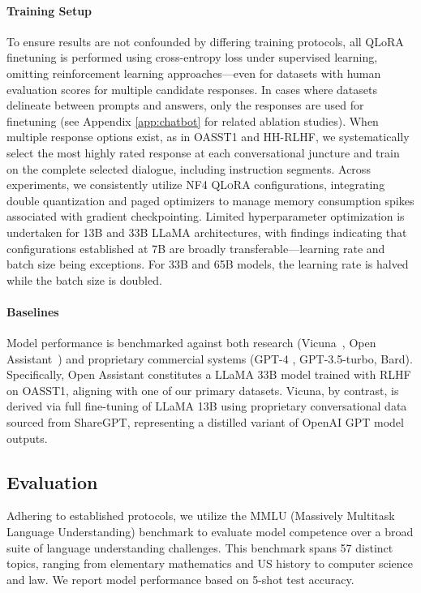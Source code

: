 \paragraph{Training Setup} To ensure results are not confounded by differing training protocols, all QLoRA finetuning is performed using cross-entropy loss under supervised learning, omitting reinforcement learning approaches—even for datasets with human evaluation scores for multiple candidate responses. In cases where datasets delineate between prompts and answers, only the responses are used for finetuning (see Appendix \ref{app:chatbot} for related ablation studies). When multiple response options exist, as in OASST1 and HH-RLHF, we systematically select the most highly rated response at each conversational juncture and train on the complete selected dialogue, including instruction segments. Across experiments, we consistently utilize NF4 \textsc{QLoRA} configurations, integrating double quantization and paged optimizers to manage memory consumption spikes associated with gradient checkpointing. Limited hyperparameter optimization is undertaken for 13B and 33B LLaMA architectures, with findings indicating that configurations established at 7B are broadly transferable—learning rate and batch size being exceptions. For 33B and 65B models, the learning rate is halved while the batch size is doubled.

\paragraph{Baselines} Model performance is benchmarked against both research (Vicuna~\citep{vicuna2023}, Open Assistant~\citep{kopf2023openassistant}) and proprietary commercial systems (GPT-4 \citep{openai2023gpt}, GPT-3.5-turbo, Bard). Specifically, Open Assistant constitutes a LLaMA 33B model trained with RLHF on OASST1, aligning with one of our primary datasets. Vicuna, by contrast, is derived via full fine-tuning of LLaMA 13B using proprietary conversational data sourced from ShareGPT, representing a distilled variant of OpenAI GPT model outputs.

\subsection{Evaluation}

Adhering to established protocols, we utilize the MMLU (Massively Multitask Language Understanding) benchmark \citep{hendrycksmeasuring} to evaluate model competence over a broad suite of language understanding challenges. This benchmark spans 57 distinct topics, ranging from elementary mathematics and US history to computer science and law. We report model performance based on 5-shot test accuracy.

